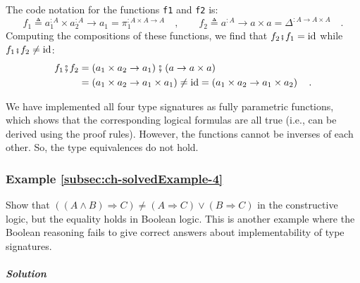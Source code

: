The code notation for the functions \lstinline!f1! and \lstinline!f2!
is:
\[
f_{1}\triangleq a_{1}^{:A}\times a_{2}^{:A}\rightarrow a_{1}=\pi_{1}^{:A\times A\rightarrow A}\quad,\quad\quad f_{2}\triangleq a^{:A}\rightarrow a\times a=\Delta^{:A\rightarrow A\times A}\quad.
\]
Computing the compositions of these functions, we find that $f_{2}\bef f_{1}=\text{id}$
while $f_{1}\bef f_{2}\ne\text{id}$:
\begin{align*}
f_{1}\bef f_{2} & =\left(a_{1}\times a_{2}\rightarrow a_{1}\right)\bef\left(a\rightarrow a\times a\right)\\
 & =\left(a_{1}\times a_{2}\rightarrow a_{1}\times a_{1}\right)\neq\text{id}=\left(a_{1}\times a_{2}\rightarrow a_{1}\times a_{2}\right)\quad.
\end{align*}

We have implemented all four type signatures as fully parametric functions,
which shows that the corresponding logical formulas are all true (i.e.,
can be derived using the proof rules). However, the functions cannot
be inverses of each other. So, the type equivalences do not hold.

\subsubsection{Example \label{subsec:ch-solvedExample-4}\ref{subsec:ch-solvedExample-4}}

Show that $\left(\left(A\wedge B\right)\Rightarrow C\right)\neq(A\Rightarrow C)\vee(B\Rightarrow C)$
in the constructive logic, but the equality holds in Boolean logic.
This is another example where the Boolean reasoning fails to give
correct answers about implementability of type signatures.

\subparagraph{Solution}

